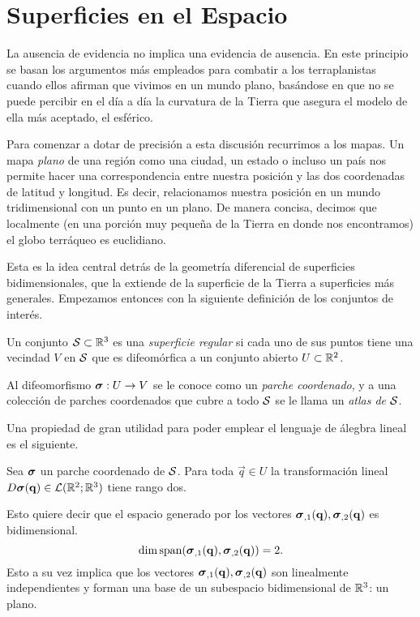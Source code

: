 \section{Superficies en el Espacio}
La ausencia de evidencia no implica una evidencia de ausencia. En este principio se basan los argumentos más empleados para combatir a los terraplanistas cuando ellos afirman que vivimos en un mundo plano, basándose en que no se puede percibir en el día a día la curvatura de la Tierra que asegura el modelo de ella más aceptado, el esférico.

Para comenzar a dotar de precisión a esta discusión recurrimos a los mapas. Un mapa \textit{plano} de una región como una ciudad, un estado o incluso un país nos permite hacer una correspondencia entre nuestra posición y las dos coordenadas de latitud y longitud. Es decir, relacionamos nuestra posición en un mundo tridimensional con un punto en un plano. De manera concisa, decimos que localmente (en una porción muy pequeña de la Tierra en donde nos encontramos) el globo terráqueo es euclidiano.

Esta es la idea central detrás de la geometría diferencial de superficies bidimensionales, que la extiende de la superficie de la Tierra a superficies más generales. Empezamos entonces con la siguiente definición de los conjuntos de interés.

\begin{definition}\label{def: surface}
	Un conjunto $\mathcal S \subset \mathbb R^3$ es una \emph{superficie regular} si cada uno de sus puntos tiene una vecindad $V$ en $\mathcal S$ que es difeomórfica a un conjunto abierto $U \subset \mathbb R^2$.
	
	Al difeomorfismo $\boldsymbol{\sigma} : U \to V$ se le conoce como un \emph{parche coordenado}, y a una colección de parches coordenados que cubre a todo $\mathcal S$ se le llama un \emph{atlas de} $\mathcal S$.
\end{definition}

Una propiedad de gran utilidad para poder emplear el lenguaje de álegbra lineal es el siguiente.
\begin{proposition}
	Sea $\boldsymbol{\sigma}$ un parche coordenado de $\mathcal S$. Para toda $\vec q \in U$ la transformación lineal $D\boldsymbol{\sigma}(\mathbf q) \in \mathcal L(\mathbb R^2; \mathbb R^3)$ tiene rango dos.
\end{proposition}
Esto quiere decir que el espacio generado por los vectores $\boldsymbol{\sigma}_{,1}(\mathbf q), \boldsymbol{\sigma}_{,2}(\mathbf q)$ es bidimensional.
\begin{equation}
	\dim \operatorname{span}(\boldsymbol{\sigma}_{,1}(\mathbf q), \boldsymbol{\sigma}_{,2}(\mathbf q)) = 2.
\end{equation}
Esto a su vez implica que los vectores $\boldsymbol{\sigma}_{,1}(\mathbf q), \boldsymbol{\sigma}_{,2}(\mathbf q)$ son linealmente independientes y forman una base de un subespacio bidimensional de $\mathbb R^3$: un plano.

